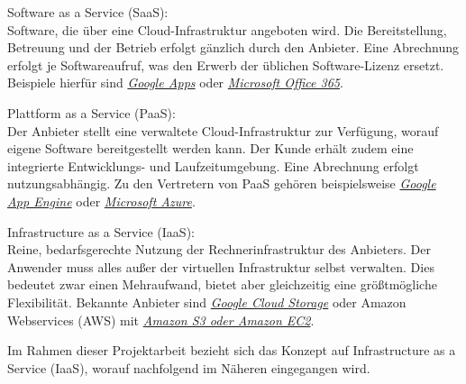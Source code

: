 \documentclass[12pt,a4paper,bibliography=totocnumbered,listof=totocnumbered]{scrartcl}
\begin{document}
\begin{compactitem}
\item Software as a Service (SaaS):\\
Software, die über eine Cloud-Infrastruktur angeboten wird. Die Bereitstellung, Betreuung und der Betrieb erfolgt gänzlich durch den Anbieter. Eine Abrechnung erfolgt je Softwareaufruf, was den Erwerb der üblichen Software-Lizenz ersetzt. Beispiele hierfür sind \href{http://www.google.com/enterprise/apps/business/}{\textit{Google Apps}} oder \href{http://office.microsoft.com/de-de/business/was-ist-office-365-fur-unternehmen-FX102997580.aspx}{\textit{Microsoft Office 365}}.
\item Plattform as a Service (PaaS):\\
Der Anbieter stellt eine verwaltete Cloud-Infrastruktur zur Verfügung, worauf eigene Software bereitgestellt werden kann. Der Kunde erhält zudem eine integrierte Entwicklungs- und Laufzeitumgebung. Eine Abrechnung erfolgt nutzungsabhängig. Zu den Vertretern von PaaS gehören beispielsweise \href{https://cloud.google.com/appengine/}{\textit{Google App Engine}} oder \href{http://azure.microsoft.com/de-de/}{\textit{Microsoft Azure}}.
\item Infrastructure as a Service (IaaS):\\
Reine, bedarfsgerechte Nutzung der Rechnerinfrastruktur des Anbieters. Der Anwender muss alles außer der virtuellen Infrastruktur selbst verwalten. Dies bedeutet zwar einen Mehraufwand, bietet aber gleichzeitig eine größtmögliche Flexibilität. Bekannte Anbieter sind \href{https://cloud.google.com/storage/}{\textit{Google Cloud Storage}} oder Amazon Webservices (AWS) mit \href{http://aws.amazon.com/de/}{\textit{Amazon S3 oder Amazon EC2}}.
\end{compactitem}

Im Rahmen dieser Projektarbeit bezieht sich das Konzept auf Infrastructure as a Service (IaaS), worauf nachfolgend im Näheren eingegangen wird.
\end{document}
